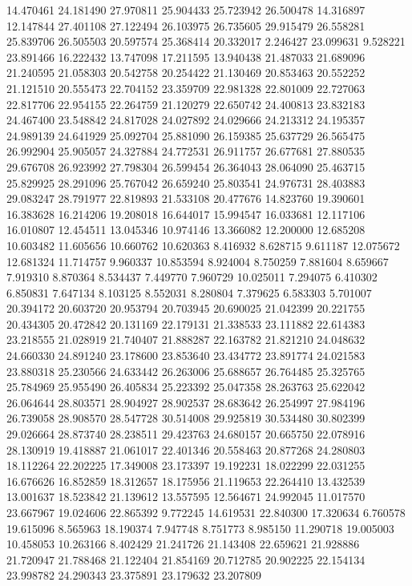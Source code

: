 14.470461
24.181490
27.970811
25.904433
25.723942
26.500478
14.316897
12.147844
27.401108
27.122494
26.103975
26.735605
29.915479
26.558281
25.839706
26.505503
20.597574
25.368414
20.332017
2.246427
23.099631
9.528221
23.891466
16.222432
13.747098
17.211595
13.940438
21.487033
21.689096
21.240595
21.058303
20.542758
20.254422
21.130469
20.853463
20.552252
21.121510
20.555473
22.704152
23.359709
22.981328
22.801009
22.727063
22.817706
22.954155
22.264759
21.120279
22.650742
24.400813
23.832183
24.467400
23.548842
24.817028
24.027892
24.029666
24.213312
24.195357
24.989139
24.641929
25.092704
25.881090
26.159385
25.637729
26.565475
26.992904
25.905057
24.327884
24.772531
26.911757
26.677681
27.880535
29.676708
26.923992
27.798304
26.599454
26.364043
28.064090
25.463715
25.829925
28.291096
25.767042
26.659240
25.803541
24.976731
28.403883
29.083247
28.791977
22.819893
21.533108
20.477676
14.823760
19.390601
16.383628
16.214206
19.208018
16.644017
15.994547
16.033681
12.117106
16.010807
12.454511
13.045346
10.974146
13.366082
12.200000
12.685208
10.603482
11.605656
10.660762
10.620363
8.416932
8.628715
9.611187
12.075672
12.681324
11.714757
9.960337
10.853594
8.924004
8.750259
7.881604
8.659667
7.919310
8.870364
8.534437
7.449770
7.960729
10.025011
7.294075
6.410302
6.850831
7.647134
8.103125
8.552031
8.280804
7.379625
6.583303
5.701007
20.394172
20.603720
20.953794
20.703945
20.690025
21.042399
20.221755
20.434305
20.472842
20.131169
22.179131
21.338533
23.111882
22.614383
23.218555
21.028919
21.740407
21.888287
22.163782
21.821210
24.048632
24.660330
24.891240
23.178600
23.853640
23.434772
23.891774
24.021583
23.880318
25.230566
24.633442
26.263006
25.688657
26.764485
25.325765
25.784969
25.955490
26.405834
25.223392
25.047358
28.263763
25.622042
26.064644
28.803571
28.904927
28.902537
28.683642
26.254997
27.984196
26.739058
28.908570
28.547728
30.514008
29.925819
30.534480
30.802399
29.026664
28.873740
28.238511
29.423763
24.680157
20.665750
22.078916
28.130919
19.418887
21.061017
22.401346
20.558463
20.877268
24.280803
18.112264
22.202225
17.349008
23.173397
19.192231
18.022299
22.031255
16.676626
16.852859
18.312657
18.175956
21.119653
22.264410
13.432539
13.001637
18.523842
21.139612
13.557595
12.564671
24.992045
11.017570
23.667967
19.024606
22.865392
9.772245
14.619531
22.840300
17.320634
6.760578
19.615096
8.565963
18.190374
7.947748
8.751773
8.985150
11.290718
19.005003
10.458053
10.263166
8.402429
21.241726
21.143408
22.659621
21.928886
21.720947
21.788468
21.122404
21.854169
20.712785
20.902225
22.154134
23.998782
24.290343
23.375891
23.179632
23.207809
